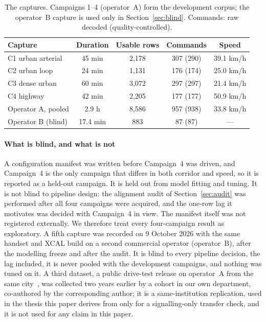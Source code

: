 \documentclass[preprint,review,12pt]{elsarticle}\usepackage{lineno}\linenumbers
\begin{document}
\begin{table}[t]
\centering
\caption{The captures. Campaigns 1--4 (operator~A) form the development corpus; the operator~B capture is used only in Section~\ref{sec:blind}. Commands: raw decoded (quality-controlled).}
\label{tab:corpus}
\footnotesize
\setlength{\tabcolsep}{3pt}
\begin{tabularx}{\linewidth}{X c c c c}
\toprule
\textbf{Capture} & \textbf{Duration} & \textbf{Usable rows} & \textbf{Commands} & \textbf{Speed} \\
\midrule
C1 urban arterial & 45 min & 2,178 & 307 (290) & 39.1 km/h \\
C2 urban loop & 24 min & 1,131 & 176 (174) & 25.0 km/h \\
C3 dense urban & 60 min & 3,072 & 297 (297) & 21.4 km/h \\
C4 highway & 42 min & 2,205 & 177 (177) & 50.9 km/h \\
Operator A, pooled & 2.9 h & 8,586 & 957 (938) & 33.8 km/h \\
\midrule
Operator B (blind) & 17.4 min & 883 & 87 (87) & --- \\
\bottomrule
\end{tabularx}
\end{table}

\paragraph{What is blind, and what is not} A configuration manifest was written before Campaign~4 was driven, and Campaign~4 is the only campaign that differs in both corridor and speed, so it is reported as a held-out campaign. It is held out from model fitting and tuning. It is not blind to pipeline design: the alignment audit of Section~\ref{sec:audit} was performed after all four campaigns were acquired, and the one-row lag it motivates was decided with Campaign~4 in view. The manifest itself was not registered externally. We therefore treat every four-campaign result as exploratory. A fifth capture was recorded on 9 October 2026 with the same handset and XCAL build on a second commercial operator (operator~B), after the modelling freeze and after the audit. It is blind to every pipeline decision, the lag included, it is never pooled with the development campaigns, and nothing was tuned on it. A third dataset, a public drive-test release on operator~A from the same city~\cite{ref38}, was collected two years earlier by a cohort in our own department, co-authored by the corresponding author; it is a same-institution replication, used in the thesis this paper derives from only for a signalling-only transfer check, and it is not used for any claim in this paper.
\end{document}
